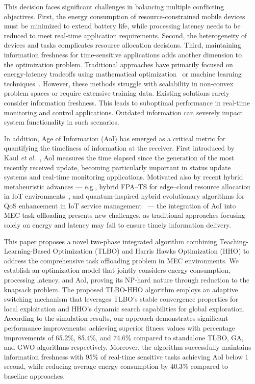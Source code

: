 \documentclass[conference]{IEEEtran}
\begin{document}
This decision faces significant challenges in balancing multiple conflicting objectives. First, the energy consumption of resource-constrained mobile devices must be minimized to extend battery life, while processing latency needs to be reduced to meet real-time application requirements. Second, the heterogeneity of devices and tasks complicates resource allocation decisions. Third, maintaining information freshness for time-sensitive applications adds another dimension to the optimization problem. Traditional approaches have primarily focused on energy-latency tradeoffs using mathematical optimization~\cite{wang2017joint} or machine learning techniques~\cite{wang2021deep}. However, these methods struggle with scalability in non-convex problem spaces or require extensive training data. Existing solutions rarely consider information freshness. This leads to suboptimal performance in real-time monitoring and control applications. Outdated information can severely impact system functionality in such scenarios.

In addition, Age of Information (AoI) has emerged as a critical metric for quantifying the timeliness of information at the receiver. First introduced by Kaul \textit{et al.}~\cite{kaul2012real}, AoI measures the time elapsed since the generation of the most recently received update, becoming particularly important in status update systems and real-time monitoring applications. Motivated also by recent hybrid metaheuristic advances — e.g., hybrid FPA–TS for edge–cloud resource allocation in IoT environments~\cite{Dankolo_2025}, and quantum‑inspired hybrid evolutionary algorithms for QoS enhancement in IoT service management~\cite{Singh_2025} — the integration of AoI into MEC task offloading presents new challenges, as traditional approaches focusing solely on energy and latency may fail to ensure timely information delivery.

This paper proposes a novel two-phase integrated algorithm combining Teaching-Learning-Based Optimization (TLBO) and Harris Hawks Optimization (HHO) to address the comprehensive task offloading problem in MEC environments. We establish an optimization model that jointly considers energy consumption, processing latency, and AoI, proving its NP-hard nature through reduction to the knapsack problem. The proposed TLBO-HHO algorithm employs an adaptive switching mechanism that leverages TLBO's stable convergence properties for local exploitation and HHO's dynamic search capabilities for global exploration. According to the simulation results, our approach demonstrates significant performance improvements: achieving superior fitness values with percentage improvements of 65.2\%, 85.4\%, and 74.6\% compared to standalone TLBO, GA, and GWO algorithms respectively. Moreover, the algorithm successfully maintains information freshness with 95\% of real-time sensitive tasks achieving AoI below 1 second, while reducing average energy consumption by 40.3\% compared to baseline approaches.
\end{document}
